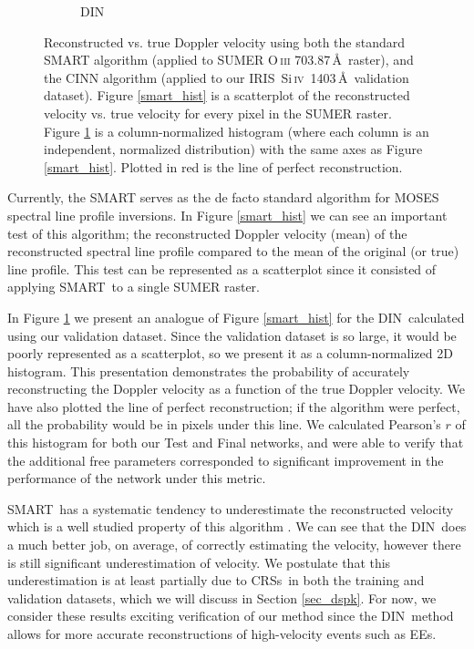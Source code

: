 \documentclass[10pt,letterpaper, doublespace]{article}
\newcommand{\SiIV}{Si\,\textsc{iv}~1403\,\AA}
\newcommand{\OIII}{O\,\textsc{iii} 703.87\,\AA}
\newcommand{\EEs}{\acp{EE}}
\newcommand{\SMART}{\ac{SMART}}
\newcommand{\DIN}{\ac{DIN}}
\newcommand{\IRIS}{\ac{IRIS}}
\newcommand{\CRSs}{\acp{CRS}}
\begin{document}
\begin{figure}[t!]
\begin{subfigure}[t]{0.5\textwidth}
					\caption{DIN}
					\label{din_hist}
				\end{subfigure}
				\caption{Reconstructed vs. true Doppler velocity using both the standard SMART algorithm (applied to SUMER \OIII\ raster), and the CINN algorithm (applied to our \IRIS\ \SiIV\ validation dataset). Figure \ref{smart_hist} is a scatterplot of the reconstructed velocity vs. true velocity for every pixel in the SUMER raster. Figure \ref{din_hist} is a column-normalized histogram (where each column is an independent, normalized distribution) with the same axes as Figure \ref{smart_hist}. Plotted in red is the line of perfect reconstruction.}
				\label{dopp_hist}
			\end{figure}

			Currently, the \SMART\citep{fox1} serves as the de facto standard algorithm for MOSES spectral line profile inversions.
			In Figure \ref{smart_hist} we can see an important test of this algorithm; the reconstructed Doppler velocity (mean) of the reconstructed spectral line profile compared to the mean of the original (or true) line profile.
			This test can be represented as a scatterplot since it consisted of applying \SMART\ to a single SUMER raster.
			
			In Figure \ref{din_hist} we present an analogue of Figure \ref{smart_hist} for the \DIN\ calculated using our validation dataset.
			Since the validation dataset is so large, it would be poorly represented as a scatterplot, so we present it as a column-normalized 2D histogram.
			This presentation demonstrates the probability of accurately reconstructing the Doppler velocity as a function of the true Doppler velocity.
			We have also plotted the line of perfect reconstruction; if the algorithm were perfect, all the probability would be in pixels under this line.
			We calculated Pearson's $r$ of this histogram for both our Test and Final networks, and were able to verify that the additional free parameters corresponded to significant improvement in the performance of the network under this metric.
			
			\SMART\ has a systematic tendency to underestimate the reconstructed velocity which is a well studied property of this algorithm \citep{Fox2011,Rust2017}.
			We can see that the \DIN\ does a much better job, on average, of correctly estimating the velocity, however there is still significant underestimation of velocity.
			We postulate that this underestimation is at least partially due to \CRSs\ in both the training and validation datasets, which we will discuss in Section \ref{sec_dspk}.
			For now, we consider these results exciting verification of our method since the \DIN\ method allows for more accurate reconstructions of high-velocity events such as \EEs.		
						
\end{document}

